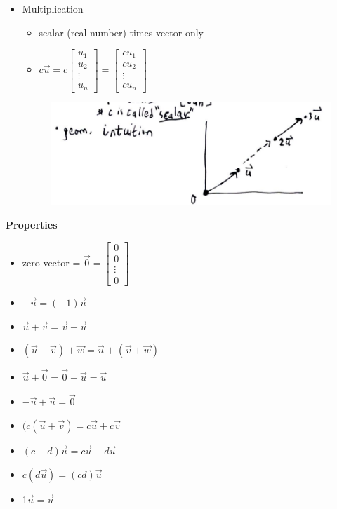 \documentclass[a4paper,12pt]{article}
\theoremstyle{definition}
\theoremstyle{definition}
\begin{document}
\begin{itemize}
		\item Multiplication
		\begin{itemize}
			\item scalar (real number) times vector only
			\item $c\vec{u} = c
			\begin{bmatrix}
				u_1\\
				u_2\\
				\vdots\\
				u_n
			\end{bmatrix}
			=
			\begin{bmatrix}
				cu_1\\
				cu_2\\
				\vdots\\
				cu_n
			\end{bmatrix}$
		\end{itemize}
		\begin{figure}[h!]
			\includegraphics[width=0.8\paperwidth]{images/vector-multiplication.PNG}
		\end{figure}
	\end{itemize}
	
	\textbf{Properties}
	\begin{itemize}
		\item zero vector = $\vec{0} =
		\begin{bmatrix}
			0\\
			0\\
			\vdots\\
			0
		\end{bmatrix}$
		\item $-\vec{u} = (-1)\vec{u}$
		\item $\vec{u} + \vec{v} = \vec{v} + \vec{u}$
		\item $(\vec{u} + \vec{v}) + \vec{w} = \vec{u} + (\vec{v} + \vec{w})$
		\item $\vec{u} + \vec{0} = \vec{0} + \vec{u} = \vec{u}$
		\item $-\vec{u} + \vec{u} = \vec{0}$
		\item $(c(\vec{u} + \vec{v}) = c\vec{u} + c\vec{v}$
		\item $(c + d)\vec{u} = c\vec{u} + d\vec{u}$
		\item $c(d\vec{u}) = (cd)\vec{u}$
		\item 1$\vec{u} = \vec{u}$
	\end{itemize}
	
\end{document}
